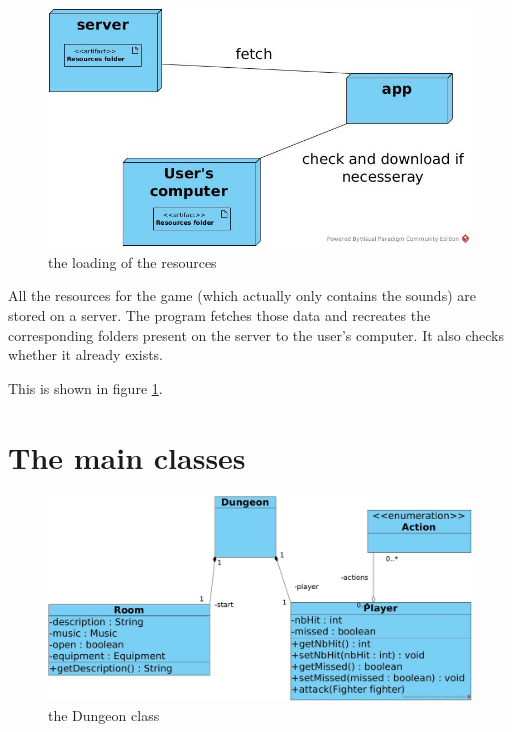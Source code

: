 \documentclass[11pt]{extarticle}
\begin{document}
\begin{figure}[ht]
    \centering
    
    \caption{the loading of the resources}
    \label{resources}
    \includegraphics[scale = 0.46]{resources}
\end{figure}

All the resources for the game (which actually only contains the sounds) are stored on a server. The program fetches those data and recreates the corresponding folders present on the server to the user's computer. It also checks whether it already exists. 

This is shown in figure \ref{resources}.

\section{The main classes}

\begin{figure}[b]
    \centering
    
    \caption{the Dungeon class}
    \label{dungeonClass}
    \includegraphics[scale = 0.2]{dungeon}
\end{figure}
\end{document}
